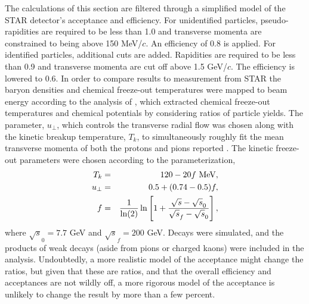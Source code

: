 The calculations of this section are filtered through a simplified model of the STAR detector's acceptance and efficiency. For unidentified particles, pseudo-rapidities are required to be less than 1.0 and transverse momenta are constrained to being above 150 MeV/$c$. An efficiency of 0.8 is applied. For identified particles, additional cuts are added. Rapidities are required to be less than 0.9 and transverse momenta are cut off above 1.5 GeV/$c$. The efficiency is lowered to 0.6. In order to compare results to measurement from STAR the baryon densities and chemical freeze-out temperatures were mapped to beam energy according to the analysis of \cite{Kumar:2012np}, which extracted chemical freeze-out temperatures and chemical potentials by considering ratios of particle yields. The parameter, $u_\perp$, which controls the transverse radial flow was chosen along with the kinetic breakup temperature, $T_k$, to simultaneously roughly fit the mean transverse momenta of both the protons and pions reported \cite{Abelev:2009bw}. The kinetic freeze-out parameters were chosen according to the parameterization,
\begin{eqnarray}
T_k&=&120-20f~{\rm MeV},\\
u_\perp&=&0.5+(0.74-0.5)f,\\
f&=&\frac{1}{\ln(2)}
\ln\left[ 1+ \frac{\sqrt{s}-\sqrt{s}_0}{\sqrt{s}_f-\sqrt{s}_0}\right],
\end{eqnarray}
where $\sqrt{s}_0=7.7$ GeV and $\sqrt{s}_f=200$ GeV. Decays were simulated, and the products of weak decays (aside from pions or charged kaons) were included in the analysis. Undoubtedly, a more realistic model of the acceptance might change the ratios, but given that these are ratios, and that the overall efficiency and acceptances are not wildly off, a more rigorous model of the acceptance is unlikely to change the result by more than a few percent.

